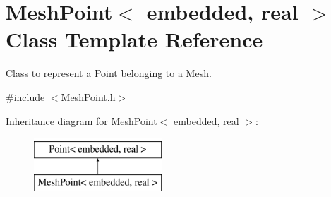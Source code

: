 \hypertarget{class_mesh_point}{}\section{Mesh\+Point$<$ embedded, real $>$ Class Template Reference}
\label{class_mesh_point}


Class to represent a \hyperlink{class_point}{Point} belonging to a \hyperlink{class_mesh}{Mesh}.  




{\ttfamily \#include $<$Mesh\+Point.\+h$>$}

Inheritance diagram for Mesh\+Point$<$ embedded, real $>$\+:\begin{figure}[H]
\begin{center}
\leavevmode
\includegraphics[height=2.000000cm]{class_mesh_point}
\end{center}
\end{figure}
